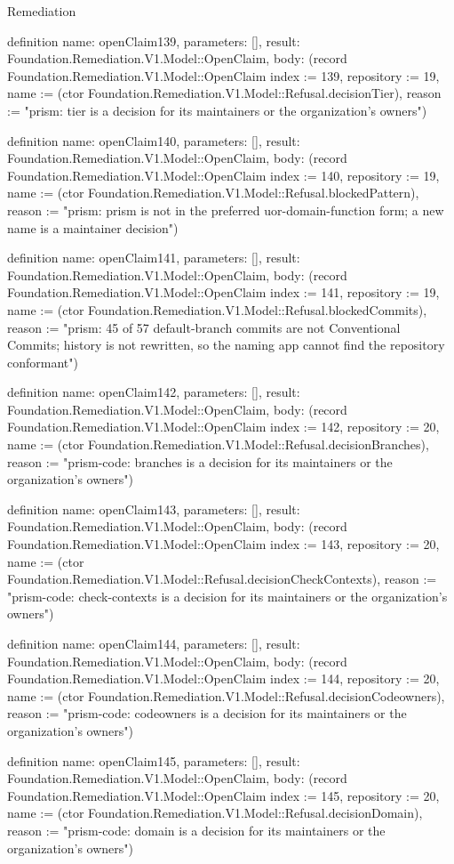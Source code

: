 \begin{lexlean}{Remediation}
\begin{semanticmodule}
definition{
  name: openClaim139,
  parameters: [],
  result: Foundation.Remediation.V1.Model::OpenClaim,
  body: (record Foundation.Remediation.V1.Model::OpenClaim {index := 139, repository := 19, name := (ctor Foundation.Remediation.V1.Model::Refusal.decisionTier), reason := "prism: tier is a decision for its maintainers or the organization's owners"})
}

definition{
  name: openClaim140,
  parameters: [],
  result: Foundation.Remediation.V1.Model::OpenClaim,
  body: (record Foundation.Remediation.V1.Model::OpenClaim {index := 140, repository := 19, name := (ctor Foundation.Remediation.V1.Model::Refusal.blockedPattern), reason := "prism: prism is not in the preferred uor-{domain}-{function} form; a new name is a maintainer decision"})
}

definition{
  name: openClaim141,
  parameters: [],
  result: Foundation.Remediation.V1.Model::OpenClaim,
  body: (record Foundation.Remediation.V1.Model::OpenClaim {index := 141, repository := 19, name := (ctor Foundation.Remediation.V1.Model::Refusal.blockedCommits), reason := "prism: 45 of 57 default-branch commits are not Conventional Commits; history is not rewritten, so the naming app cannot find the repository conformant"})
}

definition{
  name: openClaim142,
  parameters: [],
  result: Foundation.Remediation.V1.Model::OpenClaim,
  body: (record Foundation.Remediation.V1.Model::OpenClaim {index := 142, repository := 20, name := (ctor Foundation.Remediation.V1.Model::Refusal.decisionBranches), reason := "prism-code: branches is a decision for its maintainers or the organization's owners"})
}

definition{
  name: openClaim143,
  parameters: [],
  result: Foundation.Remediation.V1.Model::OpenClaim,
  body: (record Foundation.Remediation.V1.Model::OpenClaim {index := 143, repository := 20, name := (ctor Foundation.Remediation.V1.Model::Refusal.decisionCheckContexts), reason := "prism-code: check-contexts is a decision for its maintainers or the organization's owners"})
}

definition{
  name: openClaim144,
  parameters: [],
  result: Foundation.Remediation.V1.Model::OpenClaim,
  body: (record Foundation.Remediation.V1.Model::OpenClaim {index := 144, repository := 20, name := (ctor Foundation.Remediation.V1.Model::Refusal.decisionCodeowners), reason := "prism-code: codeowners is a decision for its maintainers or the organization's owners"})
}

definition{
  name: openClaim145,
  parameters: [],
  result: Foundation.Remediation.V1.Model::OpenClaim,
  body: (record Foundation.Remediation.V1.Model::OpenClaim {index := 145, repository := 20, name := (ctor Foundation.Remediation.V1.Model::Refusal.decisionDomain), reason := "prism-code: domain is a decision for its maintainers or the organization's owners"})
}


\end{semanticmodule}
\end{lexlean}

